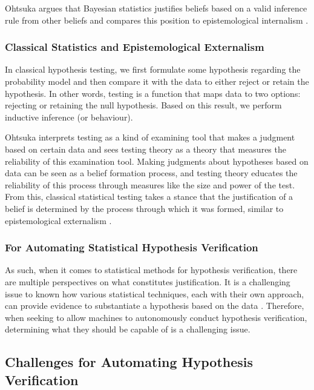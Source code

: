 Ohtsuka argues that Bayesian statistics justifies beliefs based on a valid inference rule from other beliefs and compares this position to epistemological internalism \cite{otsuka2022thinking}.

\subsubsection{Classical Statistics and Epistemological Externalism}
In classical hypothesis testing, we first formulate some hypothesis regarding the probability model and then compare it with the data to either reject or retain the hypothesis. In other words, testing is a function that maps data to two options: rejecting or retaining the null hypothesis. Based on this result, we perform inductive inference (or behaviour). 

Ohtsuka interprets testing as a kind of examining tool that makes a judgment based on certain data and sees testing theory as a theory that measures the reliability of this examination tool. Making judgments about hypotheses based on data can be seen as a belief formation process, and testing theory educates the reliability of this process through measures like the size and power of the test. From this, classical statistical testing takes a stance that the justification of a belief is determined by the process through which it was formed, similar to epistemological externalism \cite{otsuka2022thinking}.

\subsubsection{For Automating Statistical Hypothesis Verification}

As such, when it comes to statistical methods for hypothesis verification, there are multiple perspectives on what constitutes justification. It is a challenging issue to known how various statistical techniques, each with their own approach, can provide evidence to substantiate a hypothesis based on the data \cite{otsuka2022thinking,sober2008evidence,sep-statistics}. Therefore, when seeking to allow machines to autonomously conduct hypothesis verification, determining what they should be capable of is a challenging issue.

\subsection{Challenges for Automating Hypothesis Verification}

